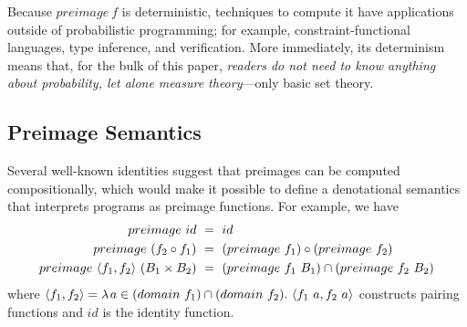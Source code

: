 \documentclass{llncs}
\begin{document}
Because $preimage~f$ is deterministic, techniques to compute it have applications outside of probabilistic programming; for example, constraint-functional languages, type inference, and verification.
More immediately, its determinism means that, for the bulk of this paper, \emph{readers do not need to know anything about probability, let alone measure theory}---only basic set theory.

\subsection{Preimage Semantics}

Several well-known identities suggest that preimages can be computed compositionally, which would make it possible to define a denotational semantics that interprets programs as preimage functions.
For example, we have
\begin{equation}
\begin{aligned}
	preimage~id &\ =\ id
\\
	preimage~(f_2 \circ f_1) &\ =\ (preimage~f_1) \circ (preimage~f_2)
\\
	preimage~\pair{f_1,f_2}~(B_1 \times B_2) &\ =\ (preimage~f_1~B_1) \i (preimage~f_2~B_2)
\end{aligned}
\label{eqn:preimage-identities}
\end{equation}
where $\langle{f_1,f_2}\rangle = \lambda\mspace{2mu}{a \in (domain~f_1) \cap(domain~f_2)}\ldotp\, \langle{f_1~a,f_2~a}\rangle$ constructs pairing functions and $id$ is the identity function.
\end{document}
